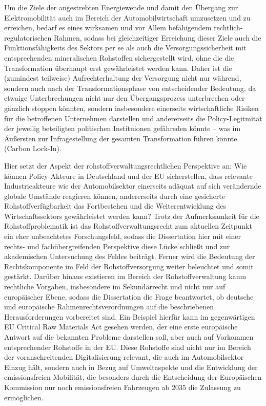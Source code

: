 \documentclass[12pt,a4paper,oneside]{book} %
\begin{document}
	Um die Ziele der angestrebten Energiewende und damit den Übergang zur Elektromobilität auch im Bereich der Automobilwirtschaft umzusetzen und zu erreichen, bedarf es eines wirksamen und vor Allem befähigendem rechtlich-regulatorischen Rahmen, sodass bei gleichzeitiger Erreichung dieser Ziele auch die Funktionsfähigkeits des Sektors per se als auch die Versorgungssicherheit mit entsprechenden mineralischen Rohstoffen sichergestellt wird, ohne die die Transformation überhaupt erst gewährleistet werden kann. Daher ist die (zumindest teilweise) Aufrechterhaltung der Versorgung nicht nur während, sondern auch nach der Transformationsphase von entscheidender Bedeutung, da etwaige Unterbrechungen nicht nur den Übergangsprozess unterbrechen oder gänzlich stoppen könnten, sondern insbesondere einerseits wirtschaftliche Risiken für die betroffenen Unternehmen darstellen und andererseits die Policy-Legitmität der jeweilig beteiligten politischen Instituionen gefähreden könnte -- was im Äußersten zur Infragestellung der gesamten Transformation führen könnte (\glqq Carbon Lock-In\grqq).
	
	Hier setzt der Aspekt der rohstoffverwaltungsrechtlichen Perspektive an: Wie können Policy-Akteure in Deutschland und der EU sicherstellen, dass relevante Industrieakteure wie der Automobilsektor einerseits adäquat auf sich verändernde globale Umstände reagieren können, andererseits durch eine gesicherte Rohstoffverfügbarkeit das Fortbestehen und die Weiterentwicklung des Wirtschaftssektors gewährleistet werden kann? Trotz der Aufmerksamkeit für die Rohstoffproblematik ist das Rohstoffverwaltungsrecht zum aktuellen Zeitpunkt ein eher unbeachtetes Forschungsfeld, sodass die Dissertation hier mit einer rechts- und fachübergreifenden Perspektive diese Lücke schließt und zur akademischen Untersuchung des Feldes beiträgt. Ferner wird die Bedeutung der Rechtskomponente im Feld der Rohstoffversorgung weiter beleuchtet und somit gestärkt. Darüber hinaus existieren im Bereich der Rohstoffverwaltung kaum rechtliche Vorgaben, insbesondere im Sekundärrecht und nicht nur auf europäischer Ebene, sodass die Dissertation die Frage beantwortet, ob deutsche und europäische Rahmenrechtsverordnungen auf die beschriebenen Herausforderungen vorbereitet sind. Ein Beispiel hierfür kann im gegenwärtigen EU Critical Raw Materials Act gesehen werden, der eine erste europäische Antwort auf die bekannten Probleme darstellen soll, aber auch auf Vorkommen entsprechender Rohstoffe in der EU. Diese Rohstoffe sind nicht nur im Bereich der voranschreitenden Digitalisierung relevant, die auch im Automobilsektor Einzug hält, sondern auch in Bezug auf Umweltaspekte und die Entwicklung der emissionsfreien Mobilität, die besonders durch die Entscheidung der Europäischen Kommission nur noch emissionsfreien Fahrzeugen ab 2035 die Zulassung zu ermöglichen.
	
\end{document}
